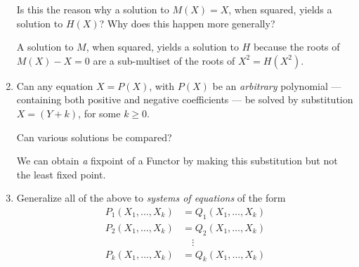 \documentclass{scrartcl}
\begin{document}
\begin{enumerate}
  Is this the reason why a solution to $M(X)=X$, when squared, yields a solution to $H(X)$?
  Why does this happen more generally?

  A solution to $M$, when squared, yields a solution to $H$ because the roots of $M(X) - X = 0$ are a sub-multiset of the roots of $X^2 = H(X^2)$.

  \item Can any equation $X=P(X)$, with $P(X)$ be an \emph{arbitrary}
  polynomial --- containing both positive and negative coefficients ---
  be solved by substitution $X = (Y+k)$, for some $k \ge 0$.

  Can various solutions be compared?

  We can obtain \textit{a} fixpoint of a Functor by making this substitution but not the least fixed point.

  \item Generalize all of the above to \emph{systems of equations} of the form
  \begin{align*}
    P_1(X_1,\dots,X_k) &= Q_1(X_1,\dots,X_k)\\
    P_2(X_1,\dots,X_k) &= Q_2(X_1,\dots,X_k)\\
     &\quad \vdots \\
    P_k(X_1,\dots,X_k) &= Q_k(X_1,\dots,X_k)
  \end{align*}
\end{enumerate}
\end{document}
